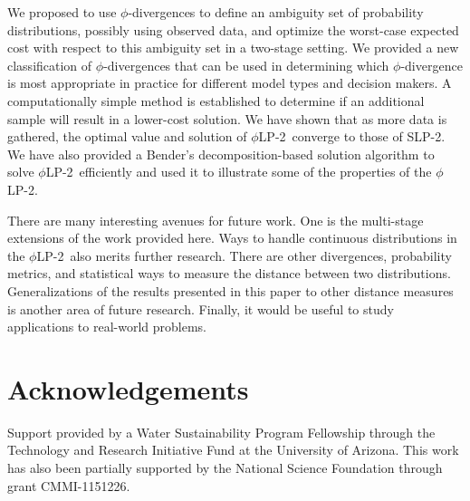 \documentclass[opre,nonblindrev]{informs3} %
\newcommand{\plp}{$\phi$LP-2}
\begin{document}
We proposed to use $\phi$-divergences
to define an ambiguity set of probability distributions, possibly using observed data, and optimize the worst-case expected cost with respect to this ambiguity set in a two-stage setting.
We provided a new classification of $\phi$-divergences that can be used in determining which $\phi$-divergence is most appropriate in practice for different model types and decision makers.
A computationally simple method is established to determine if an additional sample %
will result in a lower-cost solution.
We have shown that as more data is gathered, the optimal value and solution of \plp\ converge to those of SLP-2. 
We have also provided a Bender's decomposition-based solution algorithm to solve \plp\ efficiently and used it to illustrate some of the properties of the \plp.

There are many interesting avenues for future work. 
One is the multi-stage extensions of the work provided here. 
Ways to handle continuous distributions in the \plp\ also merits further research. 
There are other divergences, probability metrics, and statistical ways to measure the distance between two distributions. 
Generalizations of the results presented in this paper to other distance measures is another area of future research. 
Finally, it would be useful to study applications to real-world problems.



%

\section*{Acknowledgements}
Support provided by a Water Sustainability Program Fellowship through the Technology and Research Initiative Fund at the University of Arizona.
This work has also been partially supported by the National Science Foundation through grant CMMI-1151226.
\end{document}
